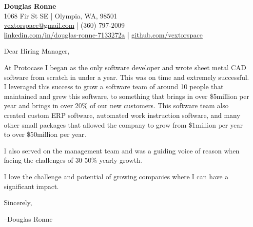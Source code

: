 \documentclass[letter,12pt]{article}
\begin{document}
\begin{center}
    {\Huge \textbf{Douglas Ronne}}\\
    \vspace{2mm}
    1068 Fir St SE | Olympia, WA, 98501\\
    \href{mailto:vextorspace@gmail.com}{vextorspace@gmail.com} | (360) 797-2009\\
    \href{www.linkedin.com/in/douglas-ronne-7133272a}{linkedin.com/in/douglas-ronne-7133272a} | \href{https://github.com/vextorspace}{github.com/vextorspace}
\end{center}

Dear Hiring Manager,

\vspace{.5cm}
\noindent
At Protocase I began as the only software developer and wrote sheet metal CAD software from scratch in under a year. This was on time and extremely successful. I leveraged this success to grow a software team of around 10 people that maintained and grew this software, to something that brings in over \$5million per year and brings in over 20\% of our new customers. This software team also created custom ERP software, automated work instruction software, and many other small packages that allowed the company to grow from \$1million per year to over \$50million per year.

\vspace{.5cm}
\noindent
I also served on the management team and was a guiding voice of reason when facing the challenges of 30-50\% yearly growth.

\vspace{.5cm}
\noindent
I love the challenge and potential of growing companies where I can have a significant impact.

\vspace{1cm}
\noindent
Sincerely,

\noindent
--Douglas Ronne
\end{document}

